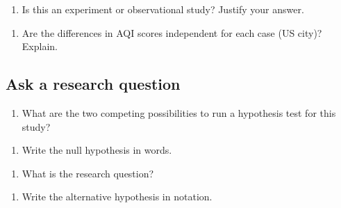 \documentclass[
]{report}
\providecommand{\tightlist}{%
  \setlength{\itemsep}{0pt}\setlength{\parskip}{0pt}}
\begin{document}
\vspace{1in}

\begin{enumerate}
\def\labelenumi{\arabic{enumi}.}
\setcounter{enumi}{3}
\tightlist
\item
  Is this an experiment or observational study? Justify your answer.
\end{enumerate}

\vspace{0.3in}

\begin{enumerate}
\def\labelenumi{\arabic{enumi}.}
\setcounter{enumi}{4}
\tightlist
\item
  Are the differences in AQI scores independent for each case (US city)? Explain.
\end{enumerate}

\vspace{0.3in}

\hypertarget{ask-a-research-question}{%
\subsection*{Ask a research question}\label{ask-a-research-question}}

\begin{enumerate}
\def\labelenumi{\arabic{enumi}.}
\setcounter{enumi}{5}
\tightlist
\item
  What are the two competing possibilities to run a hypothesis test for this study?
\end{enumerate}

\vspace{1in}

\begin{enumerate}
\def\labelenumi{\arabic{enumi}.}
\setcounter{enumi}{6}
\tightlist
\item
  Write the null hypothesis in words.
\end{enumerate}

\vspace{1in}

\begin{enumerate}
\def\labelenumi{\arabic{enumi}.}
\setcounter{enumi}{7}
\tightlist
\item
  What is the research question?
\end{enumerate}

\vspace{1in}

\begin{enumerate}
\def\labelenumi{\arabic{enumi}.}
\setcounter{enumi}{8}
\tightlist
\item
  Write the alternative hypothesis in notation.
\end{enumerate}
\end{document}
